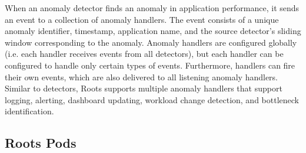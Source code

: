 When an anomaly detector finds an anomaly in application performance, it sends an event
to a collection of anomaly handlers. The event consists of a unique anomaly identifier, 
timestamp, application name, and the source detector's sliding window corresponding to the
anomaly. Anomaly handlers are configured globally (i.e. each handler
receives events from all detectors), but each handler can be configured to handle only
certain types of events. Furthermore, handlers can fire their own events, which are also delivered to
all listening anomaly handlers. Similar to detectors, Roots supports multiple anomaly handlers
that support logging, alerting, dashboard updating, 
workload change detection, and bottleneck identification.




\subsection{Roots Pods}
\label{sec:process_mgt}

